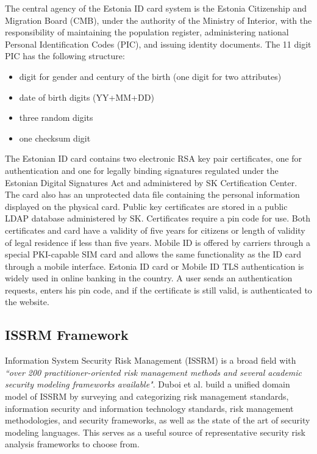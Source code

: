 \documentclass[a4paper,12pt]{article} %
\begin{document}
The central agency of the Estonia ID card system is the Estonia Citizenship and Migration Board (CMB), under the authority of the Ministry of Interior, with the responsibility of maintaining the population register, administering national Personal Identification Codes (PIC), and issuing identity documents. The 11 digit PIC has the following structure:

\begin{itemize}
	\item digit for gender and century of the birth (one digit for two attributes)
	\item date of birth digits (YY+MM+DD)
	\item three random digits
	\item one checksum digit
\end{itemize}

The Estonian ID card contains two electronic RSA key pair certificates, one for authentication and one for legally binding signatures regulated under the Estonian Digital Signatures Act and administered by SK Certification Center\cite{aboutSk2017}. The card also has an unprotected data file containing the personal information displayed on the physical card. Public key certificates are stored in a public LDAP database administered by SK\cite{skAboutLdap2017}. Certificates require a pin code for use. Both certificates and card have a validity of five years for citizens or length of validity of legal residence if less than five years. Mobile ID is offered by carriers through a special PKI-capable SIM card and allows the same functionality as the ID card through a mobile interface. Estonia ID card or Mobile ID TLS authentication is widely used in online banking in the country. A user sends an authentication requests, enters his pin code, and if the certificate is still valid, is authenticated to the website.


\subsection{ISSRM Framework} \label{ssec:2:issrmFramework}

Information System Security Risk Management (ISSRM) is a broad field with \textit{``over 200 practitioner-oriented risk management methods and several academic security modeling frameworks available"}\cite{Dubois2010}. Duboi et al. build a unified domain model of ISSRM by surveying and categorizing risk management standards, information security and information technology standards, risk management methodologies, and security frameworks, as well as the state of the art of security modeling languages. This serves as a useful source of representative security risk analysis frameworks to choose from.
\end{document}
